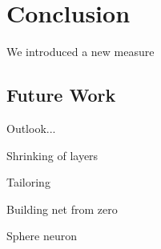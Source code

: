 \chapter{Conclusion} \label{chap:conclusion}
We introduced a new measure

\section{Future Work} \label{sec:future_work}
Outlook...

Shrinking of layers

Tailoring

Building net from zero

Sphere neuron